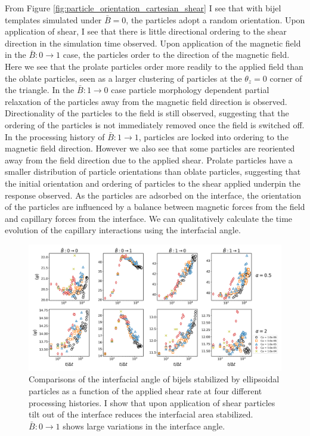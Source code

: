 From Figure \ref{fig:particle_orientation_cartesian_shear} I see that with bijel templates simulated under $\bar{B} = 0$, the
particles adopt a random orientation. Upon application of shear, I see that there is little directional ordering to the 
shear direction in the simulation time observed. Upon application of the magnetic field in the $\bar{B}:0 \rightarrow 1$ case, 
the particles order to the direction of the magnetic field. Here we see that the prolate particles order more readily to the applied
field than the oblate particles, seen as a larger clustering of particles at the $\theta_z = 0$ corner of the triangle. In the 
$\bar{B}:1 \rightarrow 0$ case particle morphology dependent partial relaxation of the particles away from the magnetic field direction 
is observed. Directionality of the particles to the field is still observed, suggesting that the ordering of the particles is not
immediately removed once the field is switched off. In the processing history of $\bar{B}:1 \rightarrow 1$, particles are locked
into ordering to the magnetic field direction. However we also see that some particles are reoriented away from the field direction
due to the applied shear. Prolate particles have a smaller distribution of particle orientations than oblate particles, suggesting that
the initial orientation and ordering of particles to the shear applied underpin the response observed. As the particles are adsorbed on the 
interface, the orientation of the particles are influenced by a balance between magnetic forces from the field and capillary forces 
from the interface. We can qualitatively calculate the time evolution of the capillary interactions using the interfacial angle.

\begin{figure} 
    \centering 
    \includegraphics[scale=0.3]{../figures/results/paper3/psi-time_compare.png} 
    \caption{Comparisons of the interfacial angle of bijels stabilized by ellipsoidal particles as a function of 
             the applied shear rate at four different processing histories. I show that upon application of shear
             particles tilt out of the interface reduces the interfacial area stabilized. $\bar{B}: 0 \to 1$ shows 
             large variations in the interface angle.} 
    \label{fig:interface_angle_shear} 
\end{figure}

